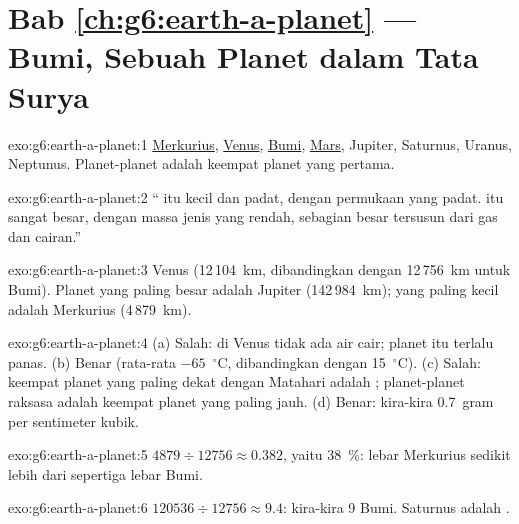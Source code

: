 \section*{Bab \ref{ch:g6:earth-a-planet} --- Bumi, Sebuah Planet dalam Tata Surya}

\begin{solution}{exo:g6:earth-a-planet:1}
\underline{Merkurius}, \underline{Venus}, \underline{Bumi},
\underline{Mars}, Jupiter, Saturnus, Uranus, Neptunus. Planet-planet 
adalah keempat planet yang pertama.
\end{solution}

\begin{solution}{exo:g6:earth-a-planet:2}
`` itu kecil dan padat, dengan permukaan yang padat.  itu sangat besar, dengan massa jenis yang rendah, sebagian besar
tersusun dari gas dan cairan.''
\end{solution}

\begin{solution}{exo:g6:earth-a-planet:3}
Venus (12\,104~km, dibandingkan dengan 12\,756~km untuk Bumi). Planet yang
paling besar adalah Jupiter (142\,984~km); yang paling kecil adalah
Merkurius (4\,879~km).
\end{solution}

\begin{solution}{exo:g6:earth-a-planet:4}
(a) Salah: di Venus tidak ada air cair; planet itu terlalu panas. (b) Benar
(rata-rata $-65$~$^\circ$C, dibandingkan dengan 15~$^\circ$C). (c) Salah:
keempat planet yang paling dekat dengan Matahari adalah ;
planet-planet raksasa adalah keempat planet yang paling jauh. (d) Benar:
kira-kira 0.7~gram per sentimeter kubik.
\end{solution}

\begin{solution}{exo:g6:earth-a-planet:5}
$4879 \div 12756 \approx 0.382$, yaitu 38~\%: lebar Merkurius sedikit lebih
dari sepertiga lebar Bumi.
\end{solution}

\begin{solution}{exo:g6:earth-a-planet:6}
$120536 \div 12756 \approx 9.4$: kira-kira 9 Bumi. Saturnus adalah .
\end{solution}

